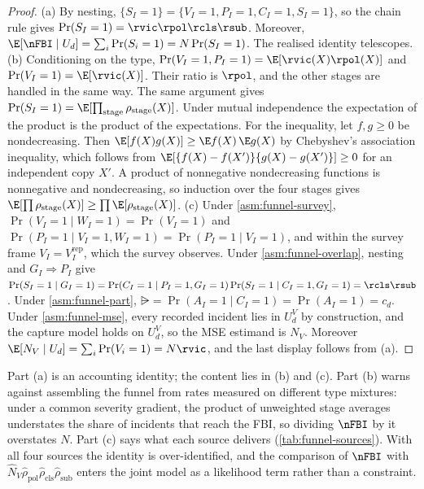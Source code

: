 \begin{proof}
(a) By nesting, $\{S_I=1\}=\{V_I=1,P_I=1,C_I=1,S_I=1\}$, so the chain rule gives $\Pr(S_I=1)=\rvic\rpol\rcls\rsub$. Moreover, $\E[\nFBI\mid U_d]=\sum_i\Pr(S_i=1)=N\Pr(S_I=1)$. The realised identity telescopes.
(b) Conditioning on the type, $\Pr(V_I=1,P_I=1)=\E[\rvic(X)\rpol(X)]$ and $\Pr(V_I=1)=\E[\rvic(X)]$. Their ratio is $\rpol$, and the other stages are handled in the same way. The same argument gives $\Pr(S_I=1)=\E[\prod_{\mathrm{stage}}\rho_{\mathrm{stage}}(X)]$. Under mutual independence the expectation of the product is the product of the expectations. For the inequality, let $f,g\ge0$ be nondecreasing. Then $\E[f(X)g(X)]\ge\E f(X)\,\E g(X)$ by Chebyshev's association inequality, which follows from $\E[\{f(X)-f(X')\}\{g(X)-g(X')\}]\ge0$ for an independent copy $X'$. A product of nonnegative nondecreasing functions is nonnegative and nondecreasing, so induction over the four stages gives $\E[\prod\rho_{\mathrm{stage}}(X)]\ge\prod\E[\rho_{\mathrm{stage}}(X)]$.
(c) Under \ref{asm:funnel-survey}, $\Pr(V_I=1\mid W_I=1)=\Pr(V_I=1)$ and $\Pr(P_I=1\mid V_I=1,W_I=1)=\Pr(P_I=1\mid V_I=1)$, and within the survey frame $V_I=V_I^{\mathrm{rep}}$, which the survey observes. Under \ref{asm:funnel-overlap}, nesting and $G_I\Rightarrow P_I$ give $\Pr(S_I=1\mid G_I=1)=\Pr(C_I=1\mid P_I=1,G_I=1)\Pr(S_I=1\mid C_I=1,G_I=1)=\rcls\rsub$. Under \ref{asm:funnel-part}, $\rsub=\Pr(A_I=1\mid C_I=1)=\Pr(A_I=1)=c_d$. Under \ref{asm:funnel-mse}, every recorded incident lies in $U_d^V$ by construction, and the capture model holds on $U_d^V$, so the MSE estimand is $N_V$. Moreover $\E[N_V\mid U_d]=\sum_i\Pr(V_i=1)=N\rvic$, and the last display follows from (a).
\end{proof}

Part (a) is an accounting identity; the content lies in (b) and (c). Part (b) warns against assembling the funnel from rates measured on different type mixtures: under a common severity gradient, the product of unweighted stage averages understates the share of incidents that reach the FBI, so dividing $\nFBI$ by it overstates $N$. Part (c) says what each source delivers (\cref{tab:funnel-sources}). With all four sources the identity is over-identified, and the comparison of $\nFBI$ with $\widehat N_V\hat\rho_{\mathrm{pol}}\hat\rho_{\mathrm{cls}}\hat\rho_{\mathrm{sub}}$ enters the joint model as a likelihood term rather than a constraint.

